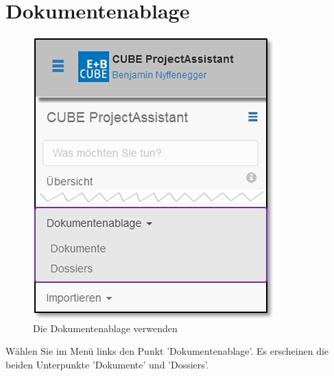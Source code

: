 
\clearpage
\section{Dokumentenablage}
\label{bkm:Ref434830029}\label{bkm:Ref434828324}

\begin{figure}   %
  \vspace{-35pt}      %
  \begin{center}
    \includegraphics[width=1\linewidth]{../chapters/11_Dokumentenablage/pictures/11_Menu_Dokumentenablage.jpg}
  \end{center}
  \vspace{-20pt}
  \caption{Die Dokumentenablage verwenden}
  \vspace{-10pt}
\end{figure}

Wählen Sie im Menü links den Punkt 'Dokumentenablage'. Es erscheinen die beiden Unterpunkte 'Dokumente' und 'Dossiers'.

\vspace{\baselineskip}

